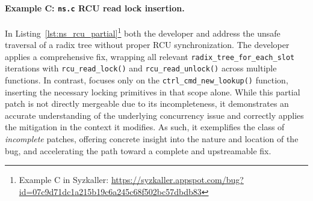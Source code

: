 \paragraph{Example C: \texttt{ns.c} RCU read lock insertion.}
In Listing~\ref{lst:ns_rcu_partial}\footnote{Example C in Syzkaller: \url{https://syzkaller.appspot.com/bug?id=07c9d71dc1a215b19c6a245c68f502bc57dbdb83}} both the developer and \cresearcher{} address the unsafe traversal of a radix tree without proper RCU synchronization. The developer applies a comprehensive fix, wrapping all relevant \verb|radix_tree_for_each_slot| iterations with \verb|rcu_read_lock()| and \verb|rcu_read_unlock()| across multiple functions. In contrast, \cresearcher{} focuses only on the \verb|ctrl_cmd_new_lookup()| function, inserting the necessary locking primitives in that scope alone. While this partial patch is not directly mergeable due to its incompleteness, it demonstrates an accurate understanding of the underlying concurrency issue and correctly applies the mitigation in the context it modifies. As such, it exemplifies the class of \emph{incomplete} patches, offering concrete insight into the nature and location of the bug, and accelerating the path toward a complete and upstreamable fix.

